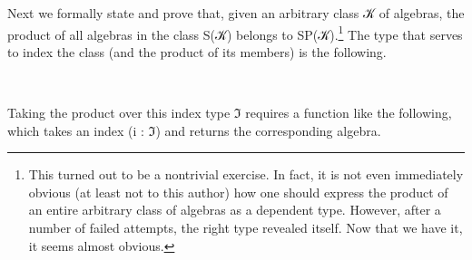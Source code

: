 \documentclass[a4paper,UKenglish,cleveref,autoref,thm-restate]{lipics-v2021}
\begin{document}
Next we formally state and prove that, given an arbitrary class \ab 𝒦 of algebras, the product of all algebras in the class \ad S(\ab 𝒦) belongs to \ad S\ad P(\ab 𝒦).\footnote{This turned out to be a nontrivial exercise. In fact, it is not even immediately obvious (at least not to this author) how one should express the product of an entire arbitrary class of algebras as a dependent type. However, after a number of failed attempts, the right type revealed itself. Now that we have it, it seems almost obvious.}
The type that serves to index the class (and the product of its members) is the following.
\ccpad
\begin{code}%
\>[1]\AgdaSpace{}%
\AgdaSymbol{:}\AgdaSpace{}%
\AgdaSymbol{\{}\AgdaSpace{}%
\AgdaSymbol{:}\AgdaSpace{}%
\AgdaSymbol{\}}\AgdaSpace{}%
%
\>[23]\AgdaSpace{}%
\AgdaSymbol{(}\AgdaSpace{}%
\AgdaSpace{}%
\AgdaSymbol{)(}\AgdaSpace{}%
\AgdaSymbol{)}\AgdaSpace{}%
\AgdaSpace{}%
\AgdaSymbol{(}\AgdaSpace{}%
\AgdaSymbol{)}\AgdaSpace{}%
\<%
\\
%
\>[1]\AgdaSpace{}%
\AgdaSymbol{\{}\AgdaSymbol{\}}\AgdaSpace{}%
\AgdaSpace{}%
\AgdaSymbol{=}\AgdaSpace{}%
\AgdaSpace{}%
\AgdaSpace{}%
\AgdaSpace{}%
\AgdaSymbol{(}\AgdaSpace{}%
\AgdaSpace{}%
\AgdaSymbol{)}\AgdaSpace{}%
\AgdaFunction{,}\AgdaSpace{}%
\AgdaSpace{}%
\AgdaSpace{}%
\<%
\end{code}
\ccpad
Taking the product over this index type \af ℑ requires a function like the following, which takes an index (i : ℑ) and returns the corresponding algebra.
\ccpad
\end{document}
